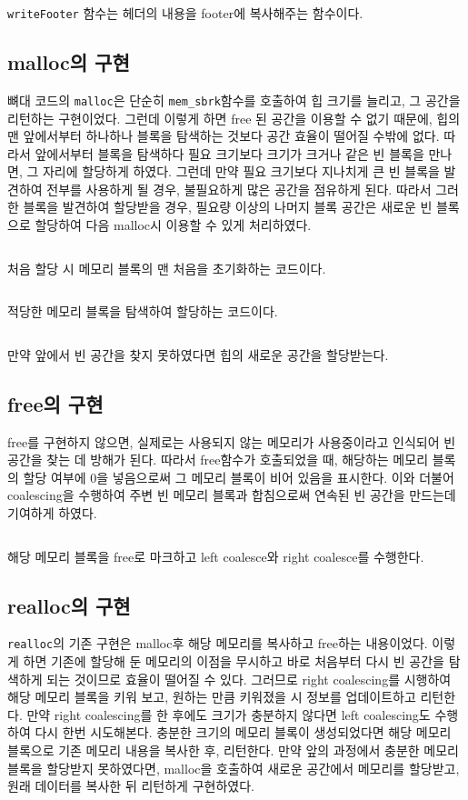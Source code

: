 \documentclass{report}
\begin{document}
\inputminted[firstline=51,lastline=54, linenos, breaklines]{C}{mm.c}
\lstinline{writeFooter} 함수는 헤더의 내용을 footer에 복사해주는 함수이다.


\subsection{malloc의 구현}
뼈대 코드의 \lstinline{malloc}은 단순히 \lstinline{mem_sbrk}함수를 호출하여 힙 크기를 늘리고, 그 공간을 리턴하는 구현이었다. 그런데 이렇게 하면 free 된 공간을 이용할 수 없기 때문에, 힙의 맨 앞에서부터 하나하나 블록을 탐색하는 것보다 공간 효율이 떨어질 수밖에 없다. 따라서 앞에서부터 블록을 탐색하다 필요 크기보다 크기가 크거나 같은 빈 블록을 만나면, 그 자리에 할당하게 하였다. 그런데 만약 필요 크기보다 지나치게 큰 빈 블록을 발견하여 전부를 사용하게 될 경우, 불필요하게 많은 공간을 점유하게 된다. 따라서 그러한 블록을 발견하여 할당받을 경우, 필요량 이상의 나머지 블록 공간은 새로운 빈 블록으로 할당하여 다음 malloc시 이용할 수 있게 처리하였다.

\inputminted[firstline=71,lastline=81, linenos, breaklines]{C}{mm.c}
처음 할당 시 메모리 블록의 맨 처음을 초기화하는 코드이다.

\inputminted[firstline=82,lastline=108, linenos, breaklines]{C}{mm.c}
적당한 메모리 블록을 탐색하여 할당하는 코드이다.
\inputminted[firstline=109,lastline=116, linenos, breaklines]{C}{mm.c}
만약 앞에서 빈 공간을 찾지 못하였다면 힙의 새로운 공간을 할당받는다.

\subsection{free의 구현}
free를 구현하지 않으면, 실제로는 사용되지 않는 메모리가 사용중이라고 인식되어 빈공간을 찾는 데 방해가 된다. 따라서 free함수가 호출되었을 때, 해당하는 메모리 블록의 할당 여부에 0을 넣음으로써 그 메모리 블록이 비어 있음을 표시한다. 이와 더불어 coalescing을 수행하여 주변 빈 메모리 블록과 합침으로써 연속된 빈 공간을 만드는데 기여하게 하였다.
\inputminted[firstline=168,lastline=176, linenos, breaklines]{C}{mm.c}
해당 메모리 블록을 free로 마크하고 left coalesce와 right coalesce를 수행한다.

\subsection{realloc의 구현}
\lstinline{realloc}의 기존 구현은 malloc후 해당 메모리를 복사하고 free하는 내용이었다. 이렇게 하면 기존에 할당해 둔 메모리의 이점을 무시하고 바로 처음부터 다시 빈 공간을 탐색하게 되는 것이므로 효율이 떨어질 수 있다. 그러므로 right coalescing를 시행하여 해당 메모리 블록을 키워 보고, 원하는 만큼 키워졌을 시 정보를 업데이트하고 리턴한다. 만약 right coalescing를 한 후에도 크기가 충분하지 않다면 left coalescing도 수행하여 다시 한번 시도해본다. 충분한 크기의 메모리 블록이 생성되었다면 해당 메모리 블록으로 기존 메모리 내용을 복사한 후, 리턴한다. 만약 앞의 과정에서 충분한 메모리 블록을 할당받지 못하였다면, malloc을 호출하여 새로운 공간에서 메모리를 할당받고, 원래 데이터를 복사한 뒤 리턴하게 구현하였다.
\end{document}
